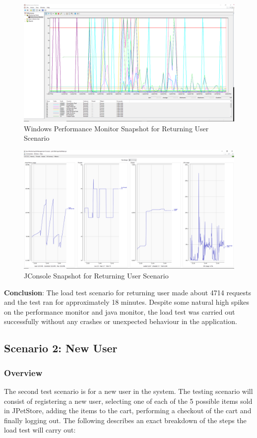 \documentclass[fontsize=12pt,paper=letter,twoside]{scrartcl}
\begin{document}
\begin{figure}[!htb]
\begin{center}
\includegraphics[width=.7\textwidth]{../../load-test/test-plans/returning-user/perfmon-ru.png}
\end{center}
\caption{Windows Performance Monitor Snapshot for Returning User Scenario}
\label{fig:ruser:perfmon}
\end{figure}

\begin{figure}[!htb]
\begin{center}
\includegraphics[width=.7\textwidth]{../../load-test/test-plans/returning-user/jconsole-ru.png}
\end{center}
\caption{JConsole Snapshot for Returning User Scenario}
\label{fig:ruser:jconsole}
\end{figure}

\smallskip
\noindent \textbf{Conclusion}: The load test scenario for returning user made about 4714 requests and the test ran for approximately 18 minutes. Despite some natural high spikes on the performance monitor and java monitor, the load test was carried out successfully without any crashes or unexpected behaviour in the application.


\newpage
\subsection{Scenario 2: New User}

\subsubsection{Overview}
The second test scenario is for a new user in the system. The testing scenario will consist of registering a new user, selecting one of each of the 5 possible items sold in JPetStore, adding the items to the cart, performing a checkout of the cart and finally logging out. The following describes an exact breakdown of the steps the load test will carry out:
\end{document}

